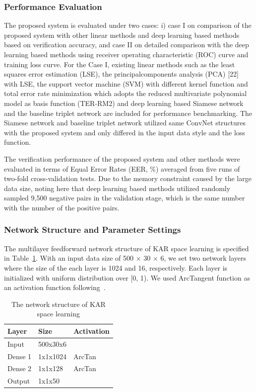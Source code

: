 \documentclass[runningheads]{llncs}
\begin{document}
\subsubsection{Performance Evaluation}
The proposed system is evaluated under two cases: i) case I on comparison of the proposed system with other linear methods and deep learning based methods based on verification accuracy, and case II on detailed comparison with the deep learning based methods using receiver operating characteristic (ROC) curve and training loss curve. For the Case I, existing linear methods such as the least squares error estimation (LSE), the principalcomponents analysis (PCA) [22] with LSE, the support vector machine (SVM) with different kernel function and total error rate minimization which adopts the reduced multivariate polynomial model as basis function (TER-RM2) \cite{toh2003fingerprint,toh2008between} and deep learning based Siamese network \cite{koch2015siamese} and the baseline triplet network \cite{hoffer2015deep} are included for performance benchmarking. The Siamese network and baseline triplet network utilized same ConvNet structures with the proposed system and only differed in the input data style and the loss function.

The verification performance of the proposed system and other methods were evaluated in terms of Equal Error Rates (EER, \%) averaged from five runs of two-fold cross-validation tests. Due to the memory constraint caused by the large data size, noting here that deep learning based methods utilized randomly sampled 9,500 negative pairs in the validation stage, which is the same number with the number of the positive pairs.

\subsubsection{Network Structure and Parameter Settings}
The multilayer feedforward network structure of KAR space learning is specified in Table~\ref{tab2}. With an input data size of 500 $\times$ 30 $\times$ 6, we set two network layers where the size of the each layer is 1024 and 16, respectively. Each layer is initialized with uniform distribution over [0, 1). We used ArcTangent function as an activation function following~\cite{toh2018gradient}.

\begin{table}[]
    \caption{The network structure of KAR space learning}\label{tab2}
    \centering
    \begin{tabular}{|l|l|l|}
    \hline
    Layer   & Size     & Activation \\ \hline
    Input   & 500x30x6 &            \\
    Dense 1 & 1x1x1024 & ArcTan     \\
    Dense 2 & 1x1x128  & ArcTan     \\
    Output  & 1x1x50   &            \\ \hline
    \end{tabular}
\end{table}
\end{document}
